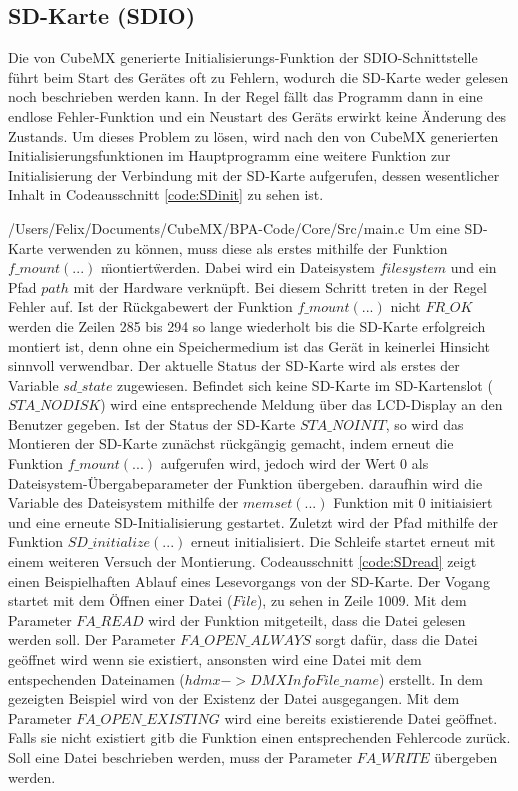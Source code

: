 
\subsection{SD-Karte (SDIO)}

Die von CubeMX generierte Initialisierungs-Funktion der SDIO-Schnittstelle führt beim Start des Gerätes oft zu Fehlern, wodurch die SD-Karte weder gelesen noch beschrieben werden kann. In der Regel fällt das Programm dann in eine endlose Fehler-Funktion und ein Neustart des Geräts erwirkt keine Änderung des Zustands. Um dieses Problem zu lösen, wird nach den von CubeMX generierten Initialisierungsfunktionen im Hauptprogramm eine weitere Funktion zur Initialisierung der Verbindung mit der SD-Karte aufgerufen, dessen wesentlicher Inhalt in Codeausschnitt \ref{code:SDinit} zu sehen ist.

{/Users/Felix/Documents/CubeMX/BPA-Code/Core/Src/main.c}
Um eine SD-Karte verwenden zu können, muss diese als erstes mithilfe der Funktion $f\_mount(...)$ \"montiert\" werden. Dabei wird ein Dateisystem $filesystem$ und ein Pfad $path$ mit der Hardware verknüpft. Bei diesem Schritt treten in der Regel Fehler auf. Ist der Rückgabewert der Funktion $f\_mount(...)$ nicht $FR\_OK$ werden die Zeilen 285 bis 294 so lange wiederholt bis die SD-Karte erfolgreich montiert ist, denn ohne ein Speichermedium ist das Gerät in keinerlei Hinsicht sinnvoll verwendbar. Der aktuelle Status der SD-Karte wird als erstes der Variable $sd\_state$ zugewiesen. Befindet sich keine SD-Karte im SD-Kartenslot ($STA\_NODISK$) wird eine entsprechende Meldung über das LCD-Display an den Benutzer gegeben. Ist der Status der SD-Karte $STA\_NOINIT$, so wird das Montieren der SD-Karte zunächst rückgängig gemacht, indem erneut die Funktion $f\_mount(...)$ aufgerufen wird, jedoch wird der Wert 0 als Dateisystem-Übergabeparameter der Funktion übergeben. daraufhin wird die Variable des Dateisystem mithilfe der $memset(...)$ Funktion mit 0 initiaisiert und eine erneute SD-Initialisierung gestartet. Zuletzt wird der Pfad mithilfe der Funktion $SD\_initialize(...)$ erneut initialisiert. Die Schleife startet erneut mit einem weiteren Versuch der Montierung.
\newline
Codeausschnitt \ref{code:SDread} zeigt einen Beispielhaften Ablauf eines Lesevorgangs von der SD-Karte. Der Vogang startet mit dem Öffnen einer Datei ($File$), zu sehen in Zeile 1009. Mit dem Parameter $FA\_READ$ wird der Funktion mitgeteilt, dass die Datei gelesen werden soll. Der Parameter $FA\_OPEN\_ALWAYS$ sorgt dafür, dass die Datei geöffnet wird wenn sie existiert, ansonsten wird eine Datei mit dem entspechenden Dateinamen ($hdmx->DMXInfoFile\_name$) erstellt. In dem gezeigten Beispiel wird von der Existenz der Datei ausgegangen. Mit dem Parameter $FA\_OPEN\_EXISTING$ wird eine bereits existierende Datei geöffnet. Falls sie nicht existiert gitb die Funktion einen entsprechenden Fehlercode zurück. Soll eine Datei beschrieben werden, muss der Parameter $FA\_WRITE$ übergeben werden.
